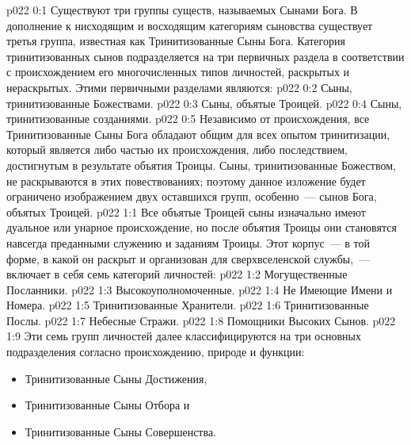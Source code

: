 \author{Могущественный Посланник}
\vs p022 0:1 Существуют три группы существ, называемых Сынами Бога. В дополнение к нисходящим и восходящим категориям сыновства существует третья группа, известная как Тринитизованные Сыны Бога. Категория тринитизованных сынов подразделяется на три первичных раздела в соответствии с происхождением его многочисленных типов личностей, раскрытых и нераскрытых. Этими первичными разделами являются:
\vs p022 0:2 Сыны, тринитизованные Божествами.
\vs p022 0:3 Сыны, объятые Троицей.
\vs p022 0:4 Сыны, тринитизованные созданиями.
\vs p022 0:5 Независимо от происхождения, все Тринитизованные Сыны Бога обладают общим для всех опытом тринитизации, который является либо частью их происхождения, либо последствием, достигнутым в результате объятия Троицы. Сыны, тринитизованные Божеством, не раскрываются в этих повествованиях; поэтому данное изложение будет ограничено изображением двух оставшихся групп, особенно~--- сынов Бога, объятых Троицей.
\vs p022 1:1 Все объятые Троицей сыны изначально имеют дуальное или унарное происхождение, но после объятия Троицы они становятся навсегда преданными служению и заданиям Троицы. Этот корпус~--- в той форме, в какой он раскрыт и организован для сверхвселенской службы,~--- включает в себя семь категорий личностей:
\vs p022 1:2 Могущественные Посланники.
\vs p022 1:3 Высокоуполномоченные.
\vs p022 1:4 Не Имеющие Имени и Номера.
\vs p022 1:5 Тринитизованные Хранители.
\vs p022 1:6 Тринитизованные Послы.
\vs p022 1:7 Небесные Стражи.
\vs p022 1:8 Помощники Высоких Сынов.
\vs p022 1:9 \pc Эти семь групп личностей далее классифицируются на три основных подразделения согласно происхождению, природе и функции: \begin{itemize}\item Тринитизованные Сыны Достижения, \item Тринитизованные Сыны Отбора и \item Тринитизованные Сыны Совершенства.\end{itemize}
